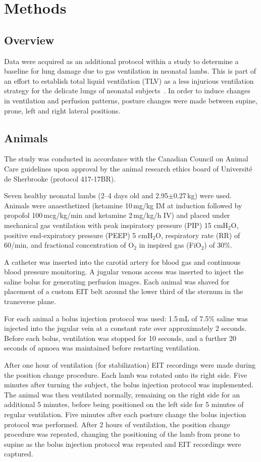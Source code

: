 \section{Methods}
\subsection{Overview}
Data were acquired as an additional protocol within 
a study to determine a baseline for 
lung damage due to gas ventilation in neonatal lambs. 
This is part of an effort to establish total liquid ventilation (TLV) as a less injurious 
ventilation strategy for the delicate lungs of neonatal 
subjects~\parencite{sage_assessing_2018}. In order to induce changes in ventilation 
and perfusion patterns, 
posture changes were made between supine, prone, left and right lateral positions. 


\subsection{Animals}  \label{animals}
The study was conducted in accordance with the Canadian Council 
on Animal Care guidelines upon approval by the animal research ethics 
board of Universit\'e de Sherbrooke (protocol 417-17BR). 

Seven healthy neonatal lambs (2--4
days old and 2.95$\pm$0.27\,kg) were used.
Animals were anaesthetized (ketamine 10\,mg/kg IM at induction followed by 
propofol 100\,mcg/kg/min and ketamine 2\,mg/kg/h IV) and placed 
under mechanical gas ventilation with peak inspiratory pressure 
(PIP) 15 cmH$_2$O, positive end-expiratory pressure (PEEP) 5 cmH$_2$O, 
respiratory rate (RR) of 60/min, and fractional concentration of O$_2$ in 
inspired gas (FiO$_2$) of 30\%.

A catheter was inserted into the carotid artery for blood gas and 
continuous blood pressure monitoring. A jugular venous access was inserted 
to inject the saline bolus for generating perfusion images. Each 
animal was shaved for placement of a custom EIT belt 
around the lower third of the sternum in the transverse plane.

For each animal a bolus injection protocol was used: 
1.5\,mL of 7.5\% saline was injected into the jugular vein
at a constant rate over approximately 2 seconds.
Before each bolus, ventilation was stopped for 10 seconds,
and a further 20 seconds of apnoea was maintained before
restarting ventilation.

After one hour of ventilation (for stabilization) EIT recordings were made 
during the position change procedure. Each lamb was rotated
onto its right side. Five minutes after turning
the subject, the bolus injection protocol was implemented.
The animal was then ventilated normally, remaining on the right side for 
an additional 5 minutes, before being positioned on the left side 
for 5 minutes of regular ventilation.  Five minutes after each posture change the bolus
injection protocol was performed.
After 2 hours of ventilation, the position change procedure was repeated,
changing the positioning of the lamb from prone to supine as the bolus 
injection protocol was repeated and EIT recordings were captured.

